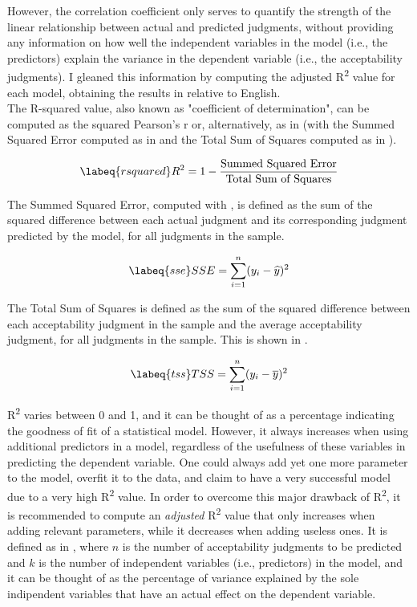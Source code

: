 However, the correlation coefficient only serves to quantify the strength of the linear relationship between actual and predicted judgments, without providing any information on how well the independent variables in the model (i.e., the predictors) explain the variance in the dependent variable (i.e., the acceptability judgments). I gleaned this information by computing the adjusted R\textsuperscript{2} value for each model, obtaining the results in  relative to English.\\
The R-squared value, also known as "coefficient of determination", can be computed as the squared Pearson's r or, alternatively, as in  (with the Summed Squared Error computed as in  and the Total Sum of Squares computed as in ).

\begin{equation} \labeq{rsquared}
R^2 = 1 - \frac{\textrm{Summed Squared Error}}{\textrm{Total Sum of Squares}}
\end{equation}

The Summed Squared Error, computed with , is defined as the sum of the squared difference between each actual judgment and its corresponding judgment predicted by the model, for all judgments in the sample.

\begin{equation} \labeq{sse}
SSE = \sum_{i=1}^{n} (y_i - \widehat{y})^2
\end{equation}

The Total Sum of Squares is defined as the sum of the squared difference between each acceptability judgment in the sample and the average acceptability judgment, for all judgments in the sample. This is shown in .

\begin{equation} \labeq{tss}
TSS = \sum_{i=1}^{n} (y_i - \overline{y})^2
\end{equation}

R\textsuperscript{2} varies between 0 and 1, and it can be thought of as a percentage indicating the goodness of fit of a statistical model. However, it always increases when using additional predictors in a model, regardless of the usefulness of these variables in predicting the dependent variable. One could always add yet one more parameter to the model, overfit it to the data, and claim to have a very successful model due to a very high R\textsuperscript{2} value. In order to overcome this major drawback of R\textsuperscript{2}, it is recommended to compute an \textit{adjusted} R\textsuperscript{2} value that only increases when adding relevant parameters, while it decreases when adding useless ones. It is defined as in , where $n$ is the number of acceptability judgments to be predicted and $k$ is the number of independent variables (i.e., predictors) in the model, and it can be thought of as the percentage of variance explained by the sole indipendent variables that have an actual effect on the dependent variable.


